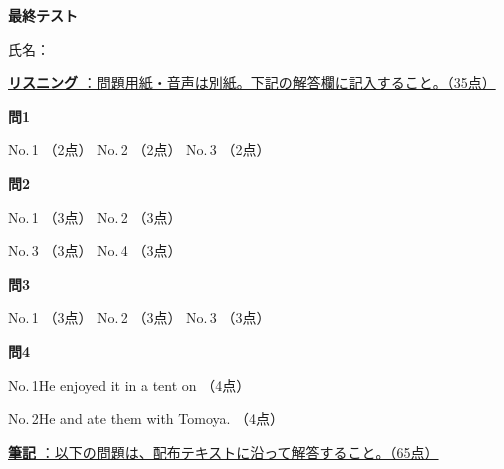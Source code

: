 
\begin{center}
{\Large\textbf{最終テスト}}
\end{center}
\vspace{0.15em}
\begin{flushright}
氏名：\testnameblank
\end{flushright}
\vspace{0.25em}
{\underline{\large\noindent\textbf{リスニング} ：問題用紙・音声は別紙。下記の解答欄に記入すること。（35点）}}
\vspace{0.5em}

\noindent\textbf{問1}
\vspace{0.4em}

\noindent
No.\,1 \listeningchoice[ア]{3.2em}（2点）\qquad
No.\,2 \listeningchoice[ウ]{3.2em}（2点）\qquad
No.\,3 \listeningchoice[ア]{3.2em}（2点）
\testqseplistening

\noindent\textbf{問2}
\vspace{0.4em}

\noindent
No.\,1 \listeningchoice[エ]{3.2em}（3点）\qquad
No.\,2 \listeningchoice[イ]{3.2em}（3点）

\vspace{0.75em}

\noindent
No.\,3 \listeningchoice[ア]{3.2em}（3点）\qquad
No.\,4 \listeningchoice[ウ]{3.2em}（3点）
\testqseplistening

\noindent\textbf{問3}
\vspace{0.4em}

\noindent
No.\,1 \listeningchoice[イ]{3.2em}（3点）\qquad
No.\,2 \listeningchoice[ウ]{3.2em}（3点）\qquad
No.\,3 \listeningchoice[エ]{3.2em}（3点）
\testqseplistening

\noindent\textbf{問4}
\vspace{0.4em}
\listeningqFourBlankSetup

\noindent No.\,1\quad He enjoyed it in a tent on  （4点）

\vspace{1em}

\noindent No.\,2\quad He  and ate them with Tomoya. （4点）

\testsectsep\vspace{1.5em}
\underline{\large\noindent\textbf{筆記} ：以下の問題は、配布テキストに沿って解答すること。（65点）}
\vspace{0.35em}
\testsectsep


